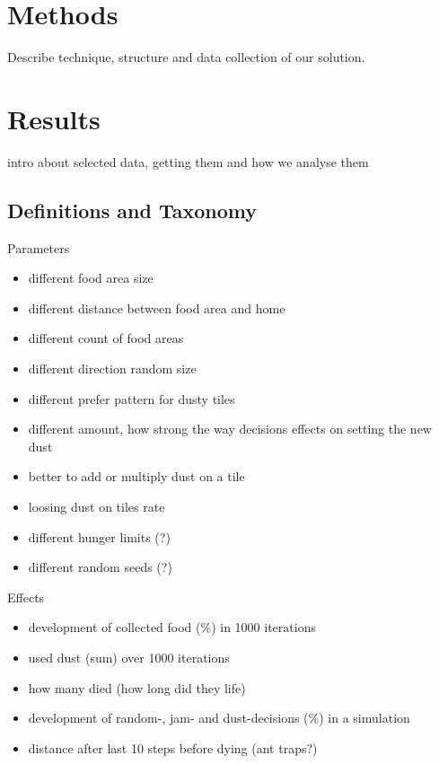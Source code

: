 \section{Methods}\label{methods}

Describe technique, structure and data collection of our solution.

\section{Results}\label{results}

intro about selected data, getting them and how we analyse them

\subsection{Definitions and Taxonomy}\label{definitions-and-taxonomy}

Parameters

\begin{itemize}
\tightlist
\item
  different food area size
\item
  different distance between food area and home
\item
  different count of food areas
\item
  different direction random size
\item
  different prefer pattern for dusty tiles
\item
  different amount, how strong the way decisions effects on setting the
  new dust
\item
  better to add or multiply dust on a tile
\item
  loosing dust on tiles rate
\item
  different hunger limits (?)
\item
  different random seeds (?)
\end{itemize}

Effects

\begin{itemize}
\tightlist
\item
  development of collected food (\%) in 1000 iterations
\item
  used dust (sum) over 1000 iterations
\item
  how many died (how long did they life)
\item
  development of random-, jam- and dust-decisions (\%) in a simulation
\item
  distance after last 10 steps before dying (ant traps?)
\end{itemize}

